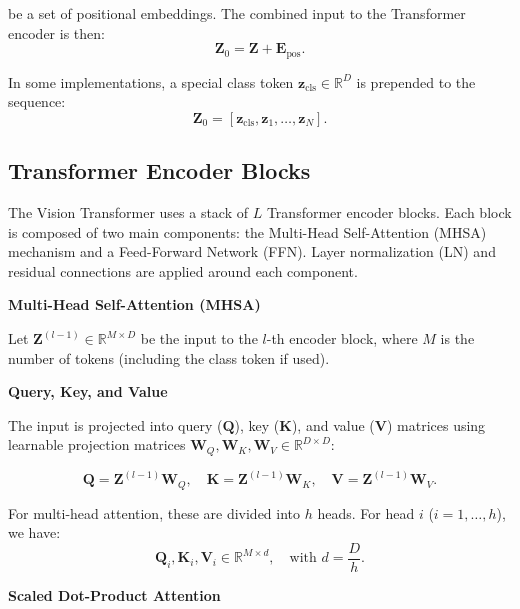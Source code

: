 be a set of positional embeddings. The combined input to the Transformer encoder is then:
\begin{equation}
\mathbf{Z}_0 = \mathbf{Z} + \mathbf{E}_{\text{pos}}.
\end{equation}

In some implementations, a special class token \(\mathbf{z}_{\text{cls}} \in \mathbb{R}^{D}\) is prepended to the sequence:
\begin{equation}
\mathbf{Z}_0 = \left[\mathbf{z}_{\text{cls}}, \mathbf{z}_1, \dots, \mathbf{z}_N \right].
\end{equation}

\subsection{Transformer Encoder Blocks}

The Vision Transformer uses a stack of \(L\) Transformer encoder blocks. Each block is composed of two main components: the Multi-Head Self-Attention (MHSA) mechanism and a Feed-Forward Network (FFN). Layer normalization (LN) and residual connections are applied around each component.

\textbf{Multi-Head Self-Attention (MHSA)}

Let \(\mathbf{Z}^{(l-1)} \in \mathbb{R}^{M \times D}\) be the input to the \(l\)-th encoder block, where \(M\) is the number of tokens (including the class token if used).

\textbf{Query, Key, and Value}

The input is projected into query (\(\mathbf{Q}\)), key (\(\mathbf{K}\)), and value (\(\mathbf{V}\)) matrices using learnable projection matrices \(\mathbf{W}_Q, \mathbf{W}_K, \mathbf{W}_V \in \mathbb{R}^{D \times D}\):

\begin{equation}
\mathbf{Q} = \mathbf{Z}^{(l-1)} \mathbf{W}_Q, \quad \mathbf{K} = \mathbf{Z}^{(l-1)} \mathbf{W}_K, \quad \mathbf{V} = \mathbf{Z}^{(l-1)} \mathbf{W}_V.
\end{equation}

For multi-head attention, these are divided into \(h\) heads. For head \(i\) (\(i=1,\dots,h\)), we have:
\begin{equation}
    \mathbf{Q}_i, \mathbf{K}_i, \mathbf{V}_i \in \mathbb{R}^{M \times d}, \quad \text{with } d = \frac{D}{h}.
\end{equation}

\textbf{Scaled Dot-Product Attention}

